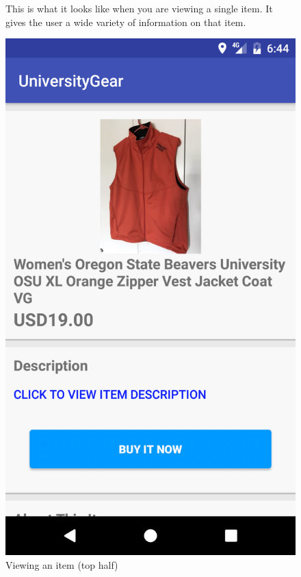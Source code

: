\documentclass[journal,compsoc, 10pt, draftclsnofoot, onecolumn]{IEEEtran}
\begin{document}
\begin{figure}[!h]
This is what it looks like when you are viewing a single item. It gives the user 
a wide variety of information on that item. 
\centering
\caption{Viewing an item (top half)}
\includegraphics[scale=.13]{singleItem1}
\end{figure}
\FloatBarrier
\end{document}
